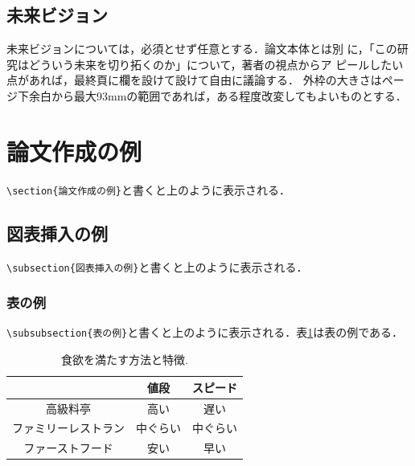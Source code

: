 \documentclass[twoside]{wiss}
\begin{document}
\subsection{未来ビジョン}
未来ビジョンについては，必須とせず任意とする．論文本体とは別
に，「この研究はどういう未来を切り拓くのか」について，著者の視点からア
ピールしたい点があれば，最終頁に欄を設けて設けて自由に議論する．
外枠の大きさはページ下余白から最大93mmの範囲であれば，ある程度改変してもよいものとする．

\section{論文作成の例}

\verb|\section{論文作成の例}|と書くと上のように表示される．

\subsection{図表挿入の例}

\verb|\subsection{図表挿入の例}|と書くと上のように表示される．

\subsubsection{表の例}

\verb|\subsubsection{表の例}|と書くと上のように表示される．表\ref{tab:restaurant}は表の例である．

\begin{table}[htb]
\caption{食欲を満たす方法と特徴.}
\label{tab:restaurant}
\begin{center}
\begin{tabular}{c|c|c}\hline\hline
 & 値段 & スピード \\\hline
高級料亭 & 高い & 遅い  \\
ファミリーレストラン & 中ぐらい & 中ぐらい  \\
ファーストフード & 安い & 早い \\
\hline\hline
\end{tabular}
\end{center}
\end{table}
\end{document}
